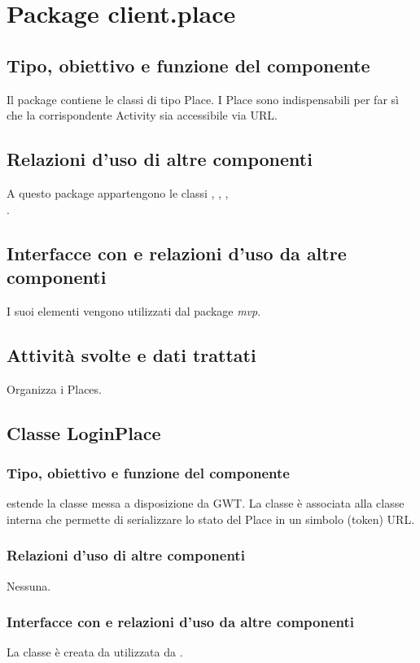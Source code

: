 \newpage
\section{Package client.place} %
\subsection*{Tipo, obiettivo e funzione del componente}
Il package contiene le classi di tipo Place. I Place sono indispensabili
per far s\`i che la corrispondente Activity sia accessibile via URL.
\subsection*{Relazioni d'uso di altre componenti}
A questo package appartengono le classi , ,
, \\.
\subsection*{Interfacce con e relazioni d'uso da altre componenti}
 I suoi elementi vengono utilizzati dal package \emph{mvp}.
\subsection*{Attivit\`a svolte e dati trattati}
Organizza i Places.

\subsection{Classe LoginPlace}
\subsubsection*{Tipo, obiettivo e funzione del componente}
 estende la classe  messa a disposizione da GWT. La
classe \`e associata alla classe interna  che permette di
serializzare lo stato del Place in un simbolo (token) URL.
\subsubsection*{Relazioni d'uso di altre componenti}
Nessuna.
\subsubsection*{Interfacce con e relazioni d'uso da altre componenti}
La classe \`e creata da  utilizzata da .
